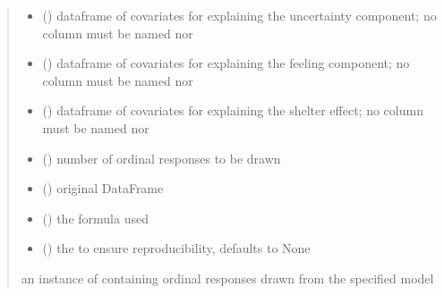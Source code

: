 \documentclass[letterpaper,10pt,english]{sphinxmanual}
\begin{document}
\begin{fulllineitems}
\begin{quote}
\begin{description}
\begin{itemize}
\item {} 
\sphinxAtStartPar
{} () \textendash{} dataframe of covariates for explaining the uncertainty component;
no column must be named  nor 

\item {} 
\sphinxAtStartPar
{} () \textendash{} dataframe of covariates for explaining the feeling component;
no column must be named  nor 

\item {} 
\sphinxAtStartPar
{} () \textendash{} dataframe of covariates for explaining the shelter effect;
no column must be named  nor 

\item {} 
\sphinxAtStartPar
{} () \textendash{} number of ordinal responses to be drawn

\item {} 
\sphinxAtStartPar
{} () \textendash{} original DataFrame

\item {} 
\sphinxAtStartPar
{} () \textendash{} the formula used

\item {} 
\sphinxAtStartPar
{} (\sphinxstyleliteralemphasis{\sphinxupquote{, }}) \textendash{} the  to ensure reproducibility, defaults to None

\end{itemize}

\sphinxAtStartPar
an instance of  containing ordinal responses drawn from the specified model

\end{description}\end{quote}

\end{fulllineitems}
\end{document}
